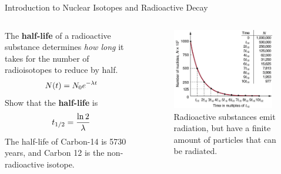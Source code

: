 \documentclass{beamer}
\begin{document}
\begin{frame}{Introduction to Nuclear Isotopes and Radioactive Decay}
\begin{columns}[T]
\begin{column}{0.5\textwidth}
\small
The \textbf{\alert{half-life}} of a radioactive substance determines \textit{how long} it takes for the number of radioisotopes to reduce by half.
\begin{equation}
N(t) = N_{\rm 0} e^{-\lambda t}
\end{equation}
Show that the \textbf{half-life} is
\begin{equation}
t_{\rm 1/2} = \frac{\ln 2}{\lambda}
\end{equation}
The half-life of Carbon-14 is 5730 years, and Carbon 12 is the non-radioactive isotope.
\end{column}
\begin{column}{0.5\textwidth}
\begin{figure}
\centering
\includegraphics[width=0.95\textwidth]{figures/half-life.png}
\caption{\label{fig:radio7} Radioactive substances emit radiation, but have a finite amount of particles that can be radiated.}
\end{figure}
\end{column}
\end{columns}
\end{frame}
\end{document}
